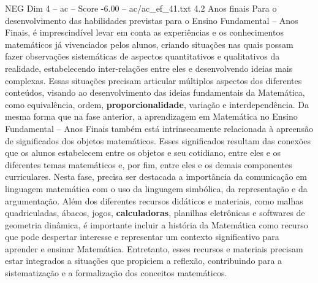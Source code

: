 \begin{textsample}{NEG Dim 4 – ac – Score -6.00 – ac/ac\_ef\_41.txt}  \label{ex:f4_neg_041}
4.2 Anos finais Para o desenvolvimento das habilidades previstas para o Ensino Fundamental – Anos Finais, é imprescindível levar em conta as experiências e os conhecimentos matemáticos já vivenciados pelos alunos, criando situações nas quais possam fazer observações sistemáticas de aspectos quantitativos e qualitativos da realidade, estabelecendo inter-relações entre eles e desenvolvendo ideias mais complexas.
Essas situações precisam articular múltiplos aspectos dos diferentes conteúdos, visando ao desenvolvimento das ideias fundamentais da Matemática, como equivalência, ordem, \textbf{proporcionalidade}, variação e interdependência.
Da mesma forma que na fase anterior, a aprendizagem em Matemática no Ensino Fundamental – Anos Finais também está intrinsecamente relacionada à apreensão de significados dos objetos matemáticos.
Esses significados resultam das conexões que os alunos estabelecem entre os objetos e seu cotidiano, entre eles e os diferentes temas matemáticos e, por fim, entre eles e os demais componentes curriculares.
Nesta fase, precisa ser destacada a importância da comunicação em linguagem matemática com o uso da linguagem simbólica, da representação e da argumentação.
Além dos diferentes recursos didáticos e materiais, como malhas quadriculadas, ábacos, jogos, \textbf{calculadoras}, planilhas eletrônicas e softwares de geometria dinâmica, é importante incluir a história da Matemática como recurso que pode despertar interesse e representar um contexto significativo para aprender e ensinar Matemática.
Entretanto, esses recursos e materiais precisam estar integrados a situações que propiciem a reflexão, contribuindo para a sistematização e a formalização dos conceitos matemáticos.

\end{textsample}
